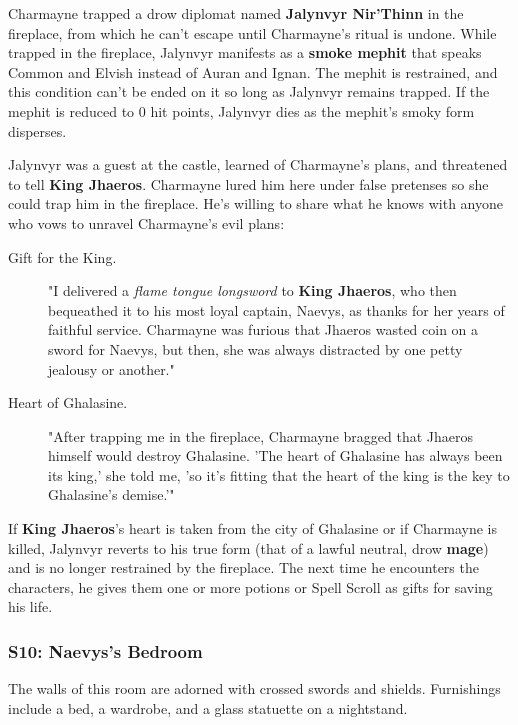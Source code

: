 \documentclass[10pt,a4paper,twoside,bg=print,twocolumn,openany,nodeprecatedcode]{dndbook}
\begin{document}
Charmayne trapped a drow diplomat named \textbf{Jalynvyr Nir'Thinn} in the fireplace, from which he can't escape until Charmayne's ritual is undone. While trapped in the fireplace, Jalynvyr manifests as a \textbf{smoke mephit} that speaks Common and Elvish instead of Auran and Ignan. The mephit is restrained, and this condition can't be ended on it so long as Jalynvyr remains trapped. If the mephit is reduced to 0 hit points, Jalynvyr dies as the mephit's smoky form disperses.

Jalynvyr was a guest at the castle, learned of Charmayne's plans, and threatened to tell \textbf{King Jhaeros}. Charmayne lured him here under false pretenses so she could trap him in the fireplace. He's willing to share what he knows with anyone who vows to unravel Charmayne's evil plans:


\begin{description}
\item[Gift for the King.]
"I delivered a \textit{flame tongue longsword} to \textbf{King Jhaeros}, who then bequeathed it to his most loyal captain, Naevys, as thanks for her years of faithful service. Charmayne was furious that Jhaeros wasted coin on a sword for Naevys, but then, she was always distracted by one petty jealousy or another."
\item[Heart of Ghalasine.]
"After trapping me in the fireplace, Charmayne bragged that Jhaeros himself would destroy Ghalasine. 'The heart of Ghalasine has always been its king,' she told me, 'so it's fitting that the heart of the king is the key to Ghalasine's demise.'"
\end{description}

If \textbf{King Jhaeros}'s heart is taken from the city of Ghalasine or if Charmayne is killed, Jalynvyr reverts to his true form (that of a lawful neutral, drow \textbf{mage}) and is no longer restrained by the fireplace. The next time he encounters the characters, he gives them one or more potions or Spell Scroll as gifts for saving his life.

\subsubsection{S10: Naevys's Bedroom}
\begin{DndReadAloud}{}
The walls of this room are adorned with crossed swords and shields. Furnishings include a bed, a wardrobe, and a glass statuette on a nightstand.

\end{DndReadAloud}
\end{document}

